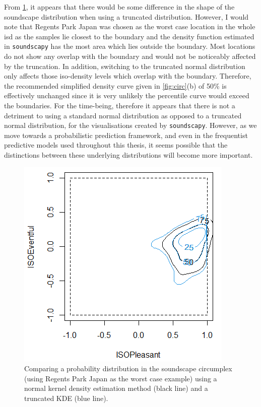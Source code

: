 {{From \cref{fig:truncatekde}, it appears that there would be some difference in the shape of the soundscape distribution when using a truncated distribution. However, I would note that Regents Park Japan was chosen as the worst case location in the whole \gls{isd} as the samples lie closest to the boundary and the density function estimated in \texttt{soundscapy} has the most area which lies outside the boundary. Most locations do not show any overlap with the boundary and would not be noticeably affected by the truncation. In addition, switching to the truncated normal distribution only affects those iso-density levels which overlap with the boundary. Therefore, the recommended simplified density curve given in \cref{fig:circ}(b) of 50\% is effectively unchanged since it is very unlikely the  percentile curve would exceed the boundaries. For the time-being, therefore it appears that there is not a detriment to using a standard normal distribution as opposed to a truncated normal distribution, for the visualisations created by \texttt{soundscapy}. However, as we move towards a probabilistic prediction framework, and even in the frequentist predictive models used throughout this thesis, it seems possible that the distinctions between these underlying distributions will become more important.
    }
}

\begin{figure}[h]
  \centering
  \includegraphics{Figures/Trunc-Normal-demo.png}
  \caption{Comparing a probability distribution in the soundscape circumplex (using Regents Park Japan as the worst case example) using a normal kernel density estimation method (black line) and a truncated KDE (blue line). \label{fig:truncatekde}}
\end{figure}

